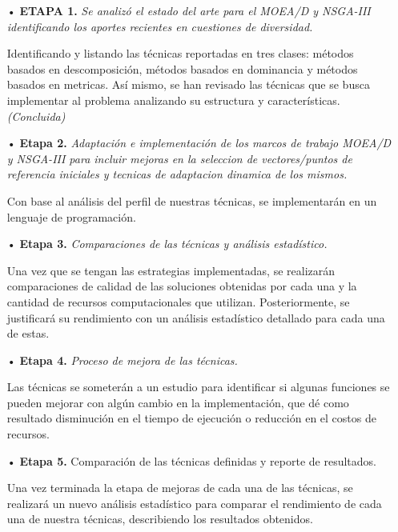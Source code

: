 \documentclass[letterpaper,10pt]{article}
\begin{document}
 \begin{itemize}
 \item[•] \textbf{ETAPA 1.} \emph{Se analizó el estado del arte para el MOEA/D y NSGA-III identificando los aportes recientes en cuestiones de diversidad.}
\item[] Identificando y listando las técnicas reportadas en tres clases: métodos basados en descomposición, métodos basados en dominancia y métodos basados en metricas. Así mismo, se han revisado las técnicas que se busca implementar al problema analizando su estructura y características.
\emph{(Concluida)}

\item[•] \textbf{Etapa 2.} \emph{Adaptación e implementación de los marcos de trabajo MOEA/D y NSGA-III para incluir mejoras en la seleccion de vectores/puntos de referencia iniciales y tecnicas de adaptacion dinamica de los mismos.}

\item[] Con base al análisis del perfil de nuestras técnicas, se implementarán en un lenguaje de programación.
        
\item[•] \textbf{Etapa 3.} \emph{Comparaciones de las técnicas y análisis estadístico.}

\item [] Una vez que se tengan las estrategias implementadas, se realizarán comparaciones de calidad de las soluciones obtenidas por cada una y la cantidad de recursos computacionales  que utilizan. Posteriormente, se justificará su rendimiento con un análisis estadístico detallado para cada  una de estas.

\item[•] \textbf{Etapa 4.} \emph{Proceso de mejora de las técnicas.}

\item[] Las técnicas se someterán a un estudio para identificar si algunas funciones se pueden mejorar con algún cambio en la implementación, que dé como resultado disminución en el tiempo de ejecución o reducción en el costos de recursos.


\item[•] \textbf{Etapa 5.} Comparación de las técnicas definidas y reporte de resultados.

\item[] Una vez terminada la etapa de mejoras de cada una de las técnicas, se realizará un nuevo análisis estadístico para comparar el rendimiento de cada una de nuestra técnicas, describiendo los resultados obtenidos.
        
  \end{itemize}
\end{document}
